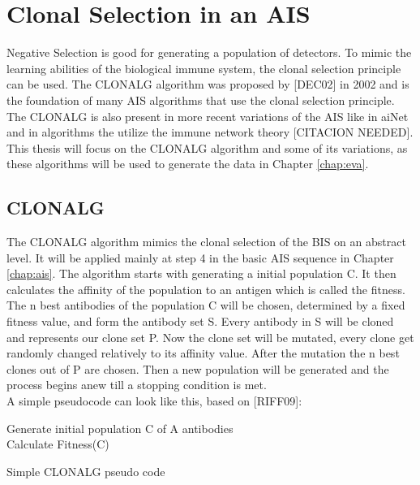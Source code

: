 \section{Clonal Selection in an AIS}
Negative Selection is good for generating a population of detectors. To mimic the learning abilities of the biological immune system, the clonal selection principle can be used. The CLONALG algorithm was proposed by [DEC02] in 2002 and is the foundation of many AIS algorithms that use the clonal selection principle. The CLONALG is also present in more recent variations of the AIS like in aiNet and in algorithms the utilize the immune network theory [CITACION NEEDED]. This thesis will focus on the CLONALG algorithm and some of its variations, as these algorithms will be used to generate the data in Chapter \ref{chap:eva}.
\subsection{CLONALG}
The CLONALG algorithm mimics the clonal selection of the BIS on an abstract level. It will be applied mainly at step 4 in the basic AIS sequence in Chapter \ref{chap:ais}. The algorithm starts with generating a initial population C. It then calculates the affinity of the population to an antigen which is called the fitness. The n best antibodies of the population C will be chosen, determined by a fixed fitness value, and form the antibody set S. Every antibody in S will be cloned and represents our clone set P. Now the clone set will be mutated, every clone get randomly changed relatively to its affinity value. After the mutation the n best clones out of P are chosen. Then a new population will be generated and the process begins anew till a stopping condition is met.\\
A simple pseudocode can look like this, based on [RIFF09]:
\begin{algorithm}
	Generate initial population C of A antibodies\\
	Calculate Fitness(C)\\
	\caption{Simple CLONALG pseudo code}
\end{algorithm}\\
